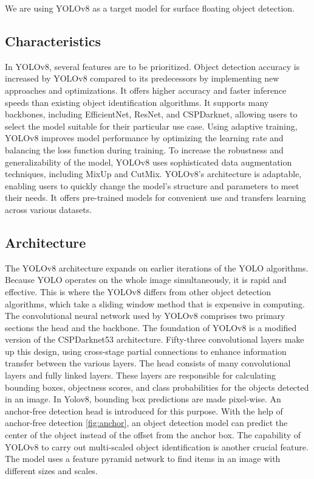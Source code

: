 \noindent We are using YOLOv8 as a target model for surface floating object detection.

    \subsection{Characteristics}
    \noindent In YOLOv8, several features are to be prioritized. Object detection accuracy is increased by YOLOv8 compared to its predecessors by implementing new approaches and optimizations. It offers higher accuracy and faster inference speeds than existing object identification algorithms. It supports many backbones, including EfficientNet, ResNet, and CSPDarknet, allowing users to select the model suitable for their particular use case. Using adaptive training, YOLOv8 improves model performance by optimizing the learning rate and balancing the loss function during training. To increase the robustness and generalizability of the model, YOLOv8 uses sophisticated data augmentation techniques, including MixUp and CutMix. YOLOv8's architecture is adaptable, enabling users to quickly change the model's structure and parameters to meet their needs. It offers pre-trained models for convenient use and transfers learning across various datasets.

    \subsection{Architecture}
    
    \noindent The YOLOv8 architecture expands on earlier iterations of the YOLO algorithms. Because YOLO operates on the whole image simultaneously, it is rapid and effective. This is where the YOLOv8 differs from other object detection algorithms, which take a sliding window method that is expensive in computing. The convolutional neural network used by YOLOv8 comprises two primary sections the head and the backbone. The foundation of YOLOv8 is a modified version of the CSPDarknet53 architecture. Fifty-three convolutional layers make up this design, using cross-stage partial connections to enhance information transfer between the various layers. The head consists of many convolutional layers and fully linked layers. These layers are responsible for calculating bounding boxes, objectness scores, and class probabilities for the objects detected in an image. In Yolov8, bounding box predictions are made pixel-wise. An anchor-free detection head is introduced for this purpose. With the help of anchor-free detection \ref{fig:anchor}, an object detection model can predict the center of the object instead of the offset from the anchor box. The capability of YOLOv8 to carry out multi-scaled object identification is another crucial feature. The model uses a feature pyramid network to find items in an image with different sizes and scales.

